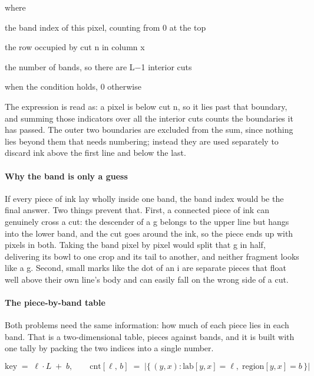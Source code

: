 \noindent where
\begin{description}[leftmargin=2.4em,style=nextline,font=\normalfont\ttfamily]\setlength\itemsep{1pt}
  \item[{$\mathrm{region}[y,x]$}] \normalfont the band index of this pixel, counting from 0 at the top
  \item[{$\mathrm{cuts}_{n}[x]$}] \normalfont the row occupied by cut n in column x
  \item[{$L$}] \normalfont the number of bands, so there are L$-$1 interior cuts
  \item[{$[\;\cdot\;]$}]  when the condition holds, 0 otherwise
\end{description}
The expression is read as: a pixel is below cut n, so it lies past that boundary, and summing those indicators over all the interior cuts counts the boundaries it has passed. The outer two boundaries are excluded from the sum, since nothing lies beyond them that needs numbering; instead they are used separately to discard ink above the first line and below the last.


\paragraph{Why the band is only a guess}
If every piece of ink lay wholly inside one band, the band index would be the final answer. Two things prevent that. First, a connected piece of ink can genuinely cross a cut: the descender of a g belongs to the upper line but hangs into the lower band, and the cut goes around the ink, so the piece ends up with pixels in both. Taking the band pixel by pixel would split that g in half, delivering its bowl to one crop and its tail to another, and neither fragment looks like a g. Second, small marks like the dot of an i are separate pieces that float well above their own line's body and can easily fall on the wrong side of a cut.


\paragraph{The piece-by-band table}
Both problems need the same information: how much of each piece lies in each band. That is a two-dimensional table, pieces against bands, and it is built with one tally by packing the two indices into a single number.


\begin{equation}
\mathrm{key} \;=\; \ell \cdot L \;+\; b, \qquad \mathrm{cnt}[\ell,\,b] \;=\; \big|\{\,(y,x) : \mathrm{lab}[y,x]=\ell,\; \mathrm{region}[y,x]=b \,\}\big|
\end{equation}

